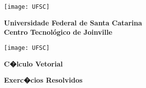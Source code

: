\documentclass[12pt]{article}
\begin{document}

\begin{tcolorbox}[colback=black!0]                                                               %
    \noindent\begin{minipage}{0.14\linewidth}
        \hspace*{-0.2cm}\texttt{[image: UFSC]}
    \end{minipage}
    \noindent\begin{minipage}{0.69\linewidth}
        \begin{center}
            \vspace*{0.2cm}
            {\bf \Large Universidade Federal de Santa Catarina} \\ \vspace{0.3cm}
            {\bf \Large Centro Tecnol{\'o}gico de Joinville} \\ \vspace{0.3cm}
        \end{center}
    \end{minipage}
    \noindent\begin{minipage}{0.14\linewidth}
        \hspace*{1.2cm}\texttt{[image: UFSC]}
    \end{minipage}
\end{tcolorbox}


\begin{tcolorbox}[colback=black!0]
    \begin{center}
        {\Large \bf C�lculo Vetorial}
    \end{center}
    \tcblower
    \begin{center}
        {\large \bf  Exerc�cios Resolvidos}
    \end{center}
\end{tcolorbox}
\end{document}

